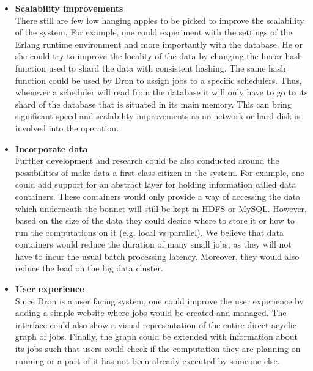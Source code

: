 \documentclass[11pt,a4paper,twoside]{report}
\begin{document}
\begin{itemize}
\item{\textbf{Scalability improvements}}\\
There still are few low hanging apples to be picked to improve the scalability of the system. For example, one could experiment with the settings of the Erlang runtime environment and more importantly with the database. He or she could try to improve the locality of the data by changing the linear hash function used to shard the data with consistent hashing. The same hash function could be used by Dron to assign jobs to a specific schedulers. Thus, whenever a scheduler will read from the database it will only have to go to its shard of the database that is situated in its main memory. This can bring significant speed and scalability improvements as no network or hard disk is involved into the operation.

\item{\textbf{Incorporate data}}\\
Further development and research could be also conducted around the possibilities of make data a first class citizen in the system. For example, one could add support for an abstract layer for holding information called data containers. These containers would only provide a way of accessing the data which underneath the bonnet will still be kept in HDFS or MySQL. However, based on the size of the data they could decide where to store it or how to run the computations on it (e.g. local vs parallel). We believe that data containers would reduce the duration of many small jobs, as they will not have to incur the usual batch processing latency. Moreover, they would also reduce the load on the big data cluster.

\item{\textbf{User experience}}\\
Since Dron is a user facing system, one could improve the user experience by adding a simple website where jobs would be created and managed. The interface could also show a visual representation of the entire direct acyclic graph of jobs. Finally, the graph could be extended with information about its jobs such that users could check if the computation they are planning on running or a part of it has not been already executed by someone else.

\end{itemize}
\end{document}
